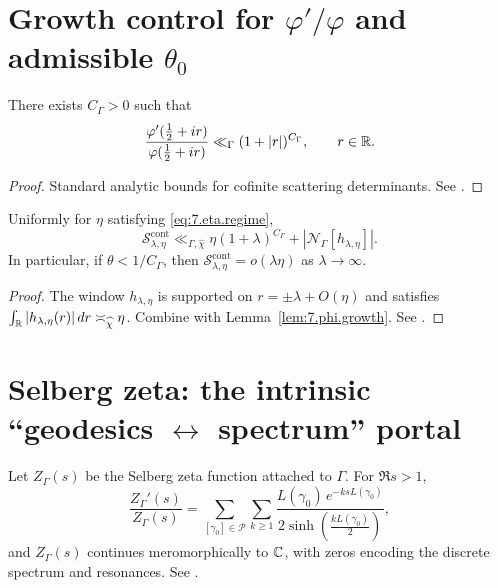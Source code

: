 \section{Growth control for $\varphi'/\varphi$ and admissible $\theta_0$}\label{sec:ch7-growth}

\begin{lemma}\label{lem:7.phi.growth}
There exists $C_\Gamma>0$ such that
\[
\frac{\varphi'(\tfrac12+ir)}{\varphi(\tfrac12+ir)}\ll_\Gamma (1+|r|)^{C_\Gamma},
\qquad r\in\mathbb{R}.
\]
\end{lemma}

\begin{proof}
Standard analytic bounds for cofinite scattering determinants. See \cite{Hejhal1983,Iwaniec2002}.
\end{proof}

\begin{proposition}\label{prop:7.cont.size}
Uniformly for $\eta$ satisfying \eqref{eq:7.eta.regime},
\[
\mathcal S^{\mathrm{cont}}_{\lambda,\eta}
\ll_{\Gamma,\widehat\chi}
\eta(1+\lambda)^{C_\Gamma}+|\mathcal N_\Gamma[h_{\lambda,\eta}]|.
\]
In particular, if $\theta<1/C_\Gamma$, then $\mathcal S^{\mathrm{cont}}_{\lambda,\eta}=o(\lambda\eta)$ as $\lambda\to\infty$.
\end{proposition}

\begin{proof}
The window $h_{\lambda,\eta}$ is supported on $r=\pm\lambda+O(\eta)$ and satisfies
$\int_{\mathbb{R}} |h_{\lambda,\eta}(r)|\,dr\asymp_{\widehat\chi}\eta$.
Combine with Lemma~\ref{lem:7.phi.growth}. See \cite{Hejhal1983}.
\end{proof}

\section{Selberg zeta: the intrinsic ``geodesics $\leftrightarrow$ spectrum'' portal}
\label{sec:ch7-selbergzeta}

\begin{proposition}\label{prop:7.ZGamma.logder}
Let $Z_\Gamma(s)$ be the Selberg zeta function attached to $\Gamma$. For $\Re s>1$,
\[
\frac{Z_\Gamma'(s)}{Z_\Gamma(s)}
=\sum_{[\gamma_0]\in\mathcal P}\sum_{k\ge1}
\frac{L(\gamma_0)\,e^{-ksL(\gamma_0)}}{2\sinh(\tfrac{kL(\gamma_0)}{2})},
\]
and $Z_\Gamma(s)$ continues meromorphically to $\mathbb{C}$, with zeros encoding the discrete spectrum and resonances.
See \cite{Hejhal1983,Iwaniec2002}.
\end{proposition}

